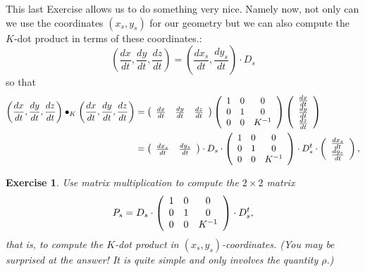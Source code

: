 \documentclass{article}%
\newtheorem{exercise}[theorem]{Exercise}
\begin{document}
This last Exercise allows us to do something very nice. Namely now, not only
can we use the coordinates $\left(  x_{s},y_{s}\right)  $ for our geometry but
we can also compute the $K$-dot product in terms of these coordinates.:%
\[
\left(  \frac{dx}{dt},\frac{dy}{dt},\frac{dz}{dt}\right)  =\left(
\frac{dx_{s}}{dt},\frac{dy_{s}}{dt}\right)  \cdot D_{s}%
\]
so that%
\begin{align*}
\left(  \frac{dx}{dt},\frac{dy}{dt},\frac{dz}{dt}\right)  \bullet_{K}\left(
\frac{dx}{dt},\frac{dy}{dt},\frac{dz}{dt}\right)   &  =\left(
\begin{array}
[c]{ccc}%
\frac{dx}{dt} & \frac{dy}{dt} & \frac{dz}{dt}%
\end{array}
\right)  \left(
\begin{array}
[c]{ccc}%
1 & 0 & 0\\
0 & 1 & 0\\
0 & 0 & K^{-1}%
\end{array}
\right)  \left(
\begin{array}
[c]{c}%
\frac{dx}{dt}\\
\frac{dy}{dt}\\
\frac{dz}{dt}%
\end{array}
\right) \\
&  =\left(
\begin{array}
[c]{cc}%
\frac{dx_{s}}{dt} & \frac{dy_{s}}{dt}%
\end{array}
\right)  \cdot D_{s}\cdot\left(
\begin{array}
[c]{ccc}%
1 & 0 & 0\\
0 & 1 & 0\\
0 & 0 & K^{-1}%
\end{array}
\right)  \cdot D_{s}^{t}\cdot\left(
\begin{array}
[c]{c}%
\frac{dx_{s}}{dt}\\
\frac{dy_{s}}{dt}%
\end{array}
\right)  ,
\end{align*}


\begin{exercise}
\label{36}Use matrix multiplication to compute the $2\times2$ matrix%
\[
P_{s}=D_{s}\cdot\left(
\begin{array}
[c]{ccc}%
1 & 0 & 0\\
0 & 1 & 0\\
0 & 0 & K^{-1}%
\end{array}
\right)  \cdot D_{s}^{t},
\]
that is, to compute the $K$-dot product in $\left(  x_{s},y_{s}\right)
$-coordinates. (You may be surprised at the answer! It is quite simple and
only involves the quantity $\rho$.)
\end{exercise}
\end{document}
